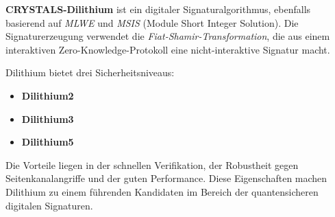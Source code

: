\textbf{CRYSTALS-Dilithium} ist ein digitaler Signaturalgorithmus, ebenfalls basierend auf \textit{MLWE} und \textit{MSIS} (Module Short Integer Solution). Die Signaturerzeugung verwendet die \textit{Fiat-Shamir-Transformation}, die aus einem interaktiven Zero-Knowledge-Protokoll eine nicht-interaktive Signatur macht.

Dilithium bietet drei Sicherheitsniveaus:

\begin{itemize}
  \item \textbf{Dilithium2}
  \item \textbf{Dilithium3}
  \item \textbf{Dilithium5}
\end{itemize}

Die Vorteile liegen in der schnellen Verifikation, der Robustheit gegen Seitenkanalangriffe und der guten Performance. Diese Eigenschaften machen Dilithium zu einem führenden Kandidaten im Bereich der quantensicheren digitalen Signaturen.
\printbibliography